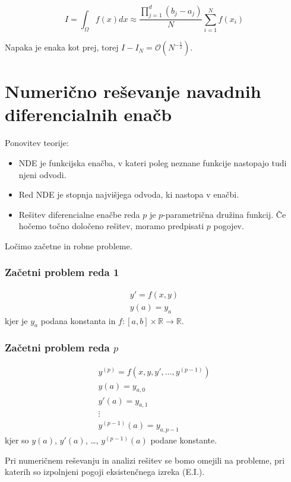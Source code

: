 \documentclass[a4paper,12pt]{article}
\theoremstyle{definition}
\theoremstyle{remark}
\newcommand{\R}{\mathbb{R}}
\begin{document}
\begin{equation*}
    I = \int_{\Omega} f(x) dx \approx \frac{\prod_{j=1}^{d} (b_j - a_j)}{N} \sum_{i=1}^{N} f(x_i)
\end{equation*}

Napaka je enaka kot prej, torej $I - I_N = \mathcal{O}(N^{-\frac{1}{2}})$.

\newpage
\section{Numerično reševanje navadnih diferencialnih enačb}

Ponovitev teorije:
\begin{itemize}
    \item NDE je funkcijska enačba, v kateri poleg neznane funkcije nastopajo tudi njeni odvodi.
    \item Red NDE je stopnja najvišjega odvoda, ki nastopa v enačbi.
    \item Rešitev diferencialne enačbe reda $p$ je $p$-parametrična družina funkcij. Če hočemo točno določeno rešitev, moramo predpisati $p$ pogojev.
\end{itemize}

Ločimo začetne in robne probleme.

\subsubsection{Začetni problem reda 1}

\begin{gather*}
    y' = f(x, y) \\
    y(a) = y_a
\end{gather*}
kjer je $y_a$ podana konstanta in $f: [a, b] \times \R \to \R$.

\subsubsection{Začetni problem reda $p$}
\begin{gather*}
    y^{(p)} = f(x, y, y', \dots, y^{(p-1)}) \\
    y(a) = y_{a, 0} \\
    y'(a) = y_{a, 1} \\
    \vdots \\
    y^{(p-1)}(a) = y_{a, p-1}
\end{gather*}
kjer so $y(a)$, $y'(a)$, \dots, $y^{(p-1)}(a)$ podane konstante.

Pri numeričnem reševanju in analizi rešitev se bomo omejili na probleme, pri katerih so izpolnjeni pogoji eksistenčnega izreka (E.I.).
\end{document}

